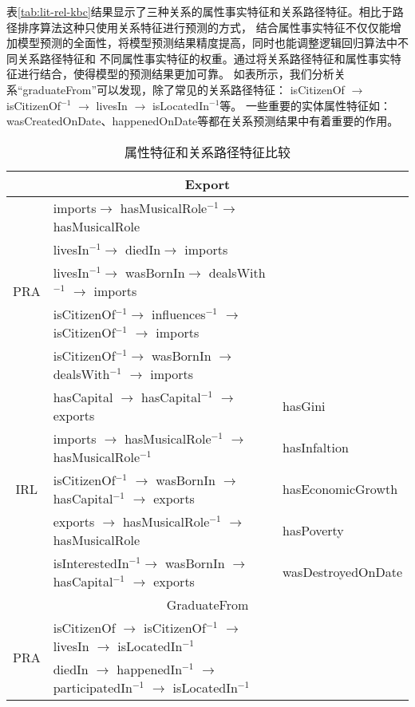 表\ref{tab:lit-rel-kbc}结果显示了三种关系的属性事实特征和关系路径特征。相比于路径排序算法这种只使用关系特征进行预测的方式，
结合属性事实特征不仅仅能增加模型预测的全面性，将模型预测结果精度提高，同时也能调整逻辑回归算法中不同关系路径特征和
不同属性事实特征的权重。通过将关系路径特征和属性事实特征进行结合，使得模型的预测结果更加可靠。
如表所示，我们分析关系“graduateFrom”可以发现，除了常见的关系路径特征：
isCitizenOf $\to$ isCitizenOf$^{-1}$ $\to$ livesIn $\to$ isLocatedIn$^{-1}$等。
一些重要的实体属性特征如：wasCreatedOnDate、happenedOnDate等都在关系预测结果中有着重要的作用。

\begin{table}[htbp]
  \centering
  \caption{属性特征和关系路径特征比较}
    \begin{tabular}{cp{12.6cm}|p{3.4cm}|}
    \toprule
    \multicolumn{3}{c}{Export} \\
    \midrule
    \multirow{5}[2]{*}{PRA} & imports$\to$ hasMusicalRole$^{-1}$$\to$ hasMusicalRole &  \\
          & livesIn$^{-1}$$\to$ diedIn$\to$ imports  &  \\
          & livesIn$^{-1}$$\to$ wasBornIn$\to$ dealsWith$^{-1}$ $\to$ imports &  \\
          & isCitizenOf$^{-1}$$\to$ influences$^{-1}$ $\to$ isCitizenOf$^{-1}$ $\to$ imports &  \\
          & isCitizenOf$^{-1}$$\to$ wasBornIn $\to$ dealsWith$^{-1}$ $\to$ imports &  \\
    \midrule
    \multirow{5}[2]{*}{IRL} & hasCapital $\to$ hasCapital$^{-1}$ $\to$ exports & hasGini \\
          & imports $\to$ hasMusicalRole$^{-1}$ $\to$ hasMusicalRole$^{-1}$ & hasInfaltion \\
          & isCitizenOf$^{-1}$ $\to$ wasBornIn $\to$ hasCapital$^{-1}$ $\to$ exports & hasEconomicGrowth \\
          & exports $\to$ hasMusicalRole$^{-1}$ $\to$ hasMusicalRole & hasPoverty \\
          & isInterestedIn$^{-1}$$\to$ wasBornIn $\to$ hasCapital$^{-1}$ $\to$ exports& wasDestroyedOnDate \\
    \midrule
    \multicolumn{3}{c}{GraduateFrom} \\
    \midrule
    \multirow{5}[2]{*}{PRA} & isCitizenOf $\to$ isCitizenOf$^{-1}$ $\to$ livesIn $\to$ isLocatedIn$^{-1}$&  \\
          & diedIn $\to$ happenedIn$^{-1}$ $\to$ participatedIn$^{-1}$ $\to$ isLocatedIn$^{-1}$ &  \\

\end{tabular}
\end{table}
